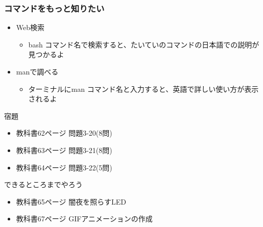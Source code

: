 \begin{frame}
    \frametitle{コマンドをもっと知りたい}
    \begin{itemize}
        \item Web検索
        \begin{itemize}
            \item bash コマンド名で検索すると、たいていのコマンドの日本語での説明が見つかるよ
        \end{itemize}
        \item manで調べる
        \begin{itemize}
            \item ターミナルにman コマンド名と入力すると、英語で詳しい使い方が表示されるよ
        \end{itemize}
    \end{itemize}
\end{frame}

\begin{frame}
    \begin{exampleblock}{宿題}
        \begin{itemize}
            \item 教科書62ページ 問題3-20(8問)
            \item 教科書63ページ 問題3-21(8問)
            \item 教科書64ページ 問題3-22(5問)
            \end{itemize}
    \end{exampleblock} 
    \begin{block}{できるところまでやろう}
        \begin{itemize}
            \item 教科書65ページ 闇夜を照らすLED
            \item 教科書67ページ GIFアニメーションの作成
        \end{itemize}
    \end{block} 
\end{frame}
